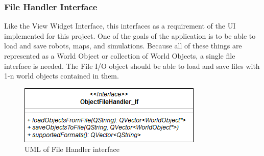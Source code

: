   \subsubsection*{File Handler Interface}
  Like the View Widget Interface, this interfaces as a requirement of the UI implemented for this project. One of the goals of the application is to be able to load and save robots, maps, and simulations. Because all of these things are represented as a World Object or collection of World Objects, a single file interface is needed. The File I/O object should be able to load and save files with 1-n world objects contained in them.
   \begin{figure}
 	\begin{center}
 	\includegraphics[scale=0.5]{./images_design/uml/FileHandler_If}
 	\caption{UML of File Handler interface\label{uml:filehandle_if}}
 	\end{center}
 \end{figure}
